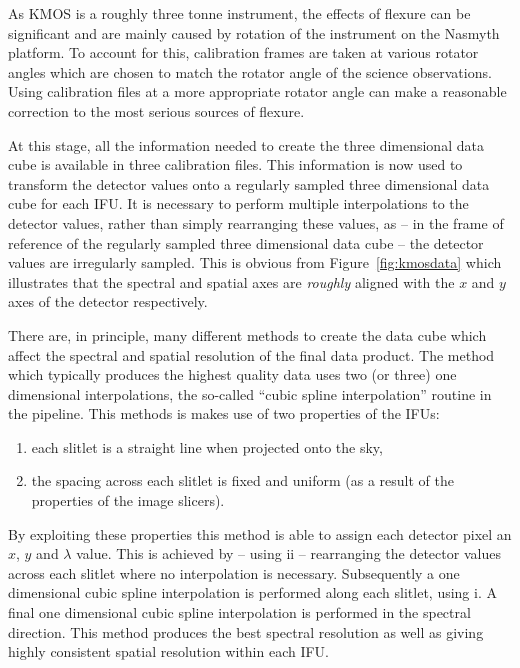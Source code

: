As KMOS is a roughly three tonne instrument, the effects of flexure can be significant and are mainly caused by rotation of the instrument on the Nasmyth platform.
To account for this, calibration frames are taken at various rotator angles which are chosen to match the rotator angle of the science observations.
Using calibration files at a more appropriate rotator angle can make a reasonable correction to the most serious sources of flexure.


At this stage, all the information needed to create the three dimensional data cube is available in three calibration files.
This information is now used to transform the detector values onto a regularly sampled three dimensional data cube for each IFU.
It is necessary to perform multiple interpolations to the detector values, rather than simply rearranging these values, as -- in the frame of reference of the regularly sampled three dimensional data cube -- the detector values are irregularly sampled.
This is obvious from Figure~\ref{fig:kmosdata} which illustrates that the spectral and spatial axes are \textit{roughly} aligned with the $x$ and $y$ axes of the detector respectively.

There are, in principle, many different methods to create the data cube which affect the spectral and spatial resolution of the final data product.
The method which typically produces the highest quality data uses two (or three) one dimensional interpolations, the so-called ``cubic spline interpolation'' routine in the pipeline.
This methods is makes use of two properties of the IFUs:

\begin{enumerate}
    \item each slitlet is a straight line when projected onto the sky,
    \item the spacing across each slitlet is fixed and uniform (as a result of the properties of the image slicers).
\end{enumerate}

By exploiting these properties this method is able to assign each detector pixel an $x$, $y$ and $\lambda$ value.
This is achieved by -- using ii -- rearranging the detector values across each slitlet where no interpolation is necessary.\footnotemark
Subsequently a one dimensional cubic spline interpolation is performed along each slitlet, using i.
A final one dimensional cubic spline interpolation is performed in the spectral direction.
This method produces the best spectral resolution as well as giving highly consistent spatial resolution within each IFU.

